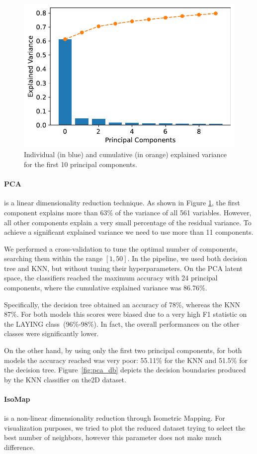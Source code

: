 \documentclass[10pt, a4paper, twocolumn]{article}
\begin{document}
\begin{figure}
\centering
    \includegraphics[width=.64\linewidth]{immagini simone/pca_explained_var.pdf}
    \caption{Individual (in blue) and cumulative (in orange) explained variance for the first 10 principal components.}
    \label{fig:expca}
\end{figure}

\paragraph{PCA} is a linear dimensionality reduction technique. As shown in Figure \ref{fig:expca}, the first component explains more than 63\% of the variance of all 561 variables. However, all other components explain a very small percentage of the residual variance. To achieve a significant explained variance we need to use more than 11 components.
    
We performed a cross-validation to tune the optimal number of components, searching them within the range $[1,50]$. In the pipeline, we used both decision tree and KNN, but without tuning their hyperparameters. On the PCA latent space, the classifiers reached the maximum accuracy with 24 principal components, where the cumulative explained variance was 86.76\%. 
    
Specifically, the decision tree obtained an accuracy of 78\%, whereas the KNN 87\%. For both models this scores were biased due to a very high F1 statistic on the LAYING class~(96\%-98\%). In fact, the overall performances on the other classes were significantly lower.

On the other hand, by using only the first two principal components, for both models the accuracy reached was very poor: 55.11\% for the KNN and 51.5\% for the decision tree. Figure~\ref{fig:pca_db} depicts the decision boundaries produced by the KNN classifier on the2D dataset.  

\paragraph{IsoMap} is a non-linear dimensionality reduction through Isometric Mapping. For visualization purposes, we tried to plot the reduced dataset trying to select the best number of neighbors, however this parameter does not make much difference.
\end{document}

